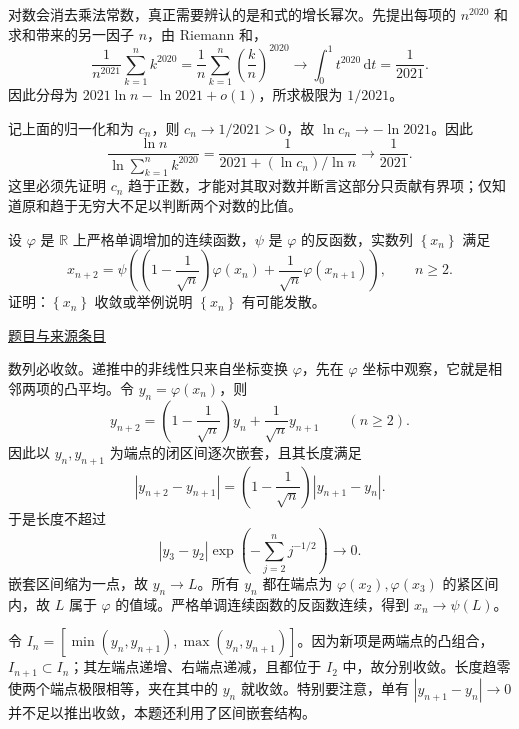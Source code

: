 \documentclass[12pt,fontset=fandol]{ctexart}
\begin{document}
\begin{solve}\label{ans:ch09-12th-A:2}

对数会消去乘法常数，真正需要辨认的是和式的增长幂次。先提出每项的 $n^{2020}$ 和求和带来的另一因子 $n$，由 Riemann 和，
\[
\frac1{n^{2021}}\sum_{k=1}^n k^{2020}
=\frac1n\sum_{k=1}^n\left(\frac kn\right)^{2020}
\longrightarrow\int_0^1t^{2020}\,\mathrm dt=\frac1{2021}.
\]
因此分母为 $2021\ln n-\ln2021+o(1)$，所求极限为 $1/2021$。

记上面的归一化和为 $c_n$，则 $c_n\to1/2021>0$，故 $\ln c_n\to-\ln2021$。因此
\[
\frac{\ln n}{\ln\sum_{k=1}^nk^{2020}}
=\frac1{2021+(\ln c_n)/\ln n}\longrightarrow\frac1{2021}.
\]
这里必须先证明 $c_n$ 趋于正数，才能对其取对数并断言这部分只贡献有界项；仅知道原和趋于无穷大不足以判断两个对数的比值。

\end{solve}

\begin{example}[来源序号5]\label{ex:ch09-12th-A:5}\label{pr:ch09-12th-A:5}

设 $\varphi$ 是 $\mathbb{R}$ 上严格单调增加的连续函数，$\psi$ 是 $\varphi$ 的反函数，实数列 $\left\{x_{n}\right\}$ 满足
\[
x_{n+2}=\psi\left(\left(1-\frac{1}{\sqrt{n}}\right)\varphi\left(x_{n}\right)+\frac{1}{\sqrt{n}}\varphi\left(x_{n+1}\right)\right),\qquad n\geq 2.
\]
证明：$\left\{x_{n}\right\}$ 收敛或举例说明 $\left\{x_{n}\right\}$ 有可能发散。

\par\href{https://github.com/lzxcr/cmc-mathematics/blob/64916fa1fdbc3e444a652eca204d5669058ee321/src/problems/preliminary/12/05.md}{题目与来源条目}

\end{example}

\begin{solve}\label{ans:ch09-12th-A:5}

数列必收敛。递推中的非线性只来自坐标变换 $\varphi$，先在 $\varphi$ 坐标中观察，它就是相邻两项的凸平均。令 $y_n=\varphi(x_n)$，则
\[
y_{n+2}=\left(1-\frac1{\sqrt n}\right)y_n
+\frac1{\sqrt n}y_{n+1}\qquad(n\geq2).
\]
因此以 $y_n,y_{n+1}$ 为端点的闭区间逐次嵌套，且其长度满足
\[
|y_{n+2}-y_{n+1}|
=\left(1-\frac1{\sqrt n}\right)|y_{n+1}-y_n|.
\]
于是长度不超过
\[
|y_3-y_2|\exp\left(-\sum_{j=2}^n j^{-1/2}\right)\longrightarrow0.
\]
嵌套区间缩为一点，故 $y_n\to L$。所有 $y_n$ 都在端点为 $\varphi(x_2),\varphi(x_3)$ 的紧区间内，故 $L$ 属于 $\varphi$ 的值域。严格单调连续函数的反函数连续，得到 $x_n\to\psi(L)$。

令 $I_n=[\min(y_n,y_{n+1}),\max(y_n,y_{n+1})]$。因为新项是两端点的凸组合，$I_{n+1}\subset I_n$；其左端点递增、右端点递减，且都位于 $I_2$ 中，故分别收敛。长度趋零使两个端点极限相等，夹在其中的 $y_n$ 就收敛。特别要注意，单有 $|y_{n+1}-y_n|\to0$ 并不足以推出收敛，本题还利用了区间嵌套结构。

\end{solve}
\end{document}
